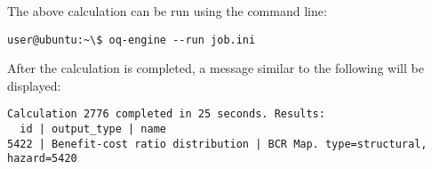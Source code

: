 The above calculation can be run using the command line:

\begin{verbatim}
user@ubuntu:~\$ oq-engine --run job.ini
\end{verbatim}

After the calculation is completed, a message similar to the following will be
displayed:

\begin{verbatim}
Calculation 2776 completed in 25 seconds. Results:
  id | output_type | name
5422 | Benefit-cost ratio distribution | BCR Map. type=structural, hazard=5420
\end{verbatim}